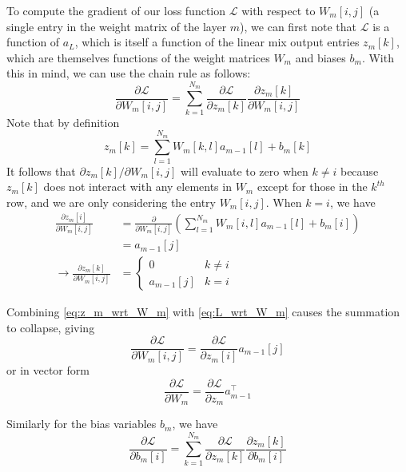 To compute the gradient of our loss function $\mathcal{L}$ with respect to $W_m[i, j]$ (a single entry in the weight matrix of the layer $m$), we can first note that $\mathcal{L}$ is a function of $a_L$, which is itself a function of the linear mix output entries $z_m[k]$, which are themselves functions of the weight matrices $W_m$ and biases $b_m$.
With this in mind, we can use the chain rule as follows:
\begin{equation}
\frac{\partial \mathcal{L}}{\partial W_m[i, j]} = \sum_{k = 1}^{N_m} \frac{\partial \mathcal{L}}{\partial z_m[k]} \frac{\partial z_m[k]}{\partial W_m[i, j]}
\label{eq:L_wrt_W_m}
\end{equation}
Note that by definition
\begin{equation}
z_m[k] = \sum_{l = 1}^{N_m} W_m[k, l] a_{m - 1}[l] + b_m[k]
\end{equation}
It follows that $\partial z_m[k]/\partial W_m[i, j]$ will evaluate to zero when $k \ne i$ because $z_m[k]$ does not interact with any elements in $W_m$ except for those in the $k^{th}$ row, and we are only considering the entry $W_m[i, j]$.
When $k = i$, we have
\begin{align}
\frac{\partial z_m[i]}{\partial W_m[i, j]} &= \frac{\partial}{\partial W_m[i, j]}\left(\sum_{l = 1}^{N_m} W_m[i, l] a_{m - 1}[l] + b_m[i]\right)\\
                                           &= a_{m - 1}[j]\\
\rightarrow \frac{\partial z_m[k]}{\partial W_m[i, j]} &= \begin{cases}
0 & k \ne i\\
a_{m - 1}[j] & k = i
\end{cases}
\label{eq:z_m_wrt_W_m}
\end{align}

Combining \cref{eq:z_m_wrt_W_m} with \cref{eq:L_wrt_W_m} causes the summation to collapse, giving
\begin{equation}
\frac{\partial \mathcal{L}}{\partial W_m[i, j]} = \frac{\partial \mathcal{L}}{\partial z_m[i]} a_{m - 1}[j]
\end{equation}
or in vector form
\begin{equation}
\frac{\partial \mathcal{L}}{\partial W_m} = \frac{\partial \mathcal{L}}{\partial z_m} a_{m - 1}^\top
\end{equation}

Similarly for the bias variables $b_m$, we have
\begin{equation}
\frac{\partial \mathcal{L}}{\partial b_m[i]} = \sum_{k = 1}^{N_m} \frac{\partial \mathcal{L}}{\partial z_m[k]} \frac{\partial z_m[k]}{\partial b_m[i]}
\label{eq:L_wrt_b_m}
\end{equation}


